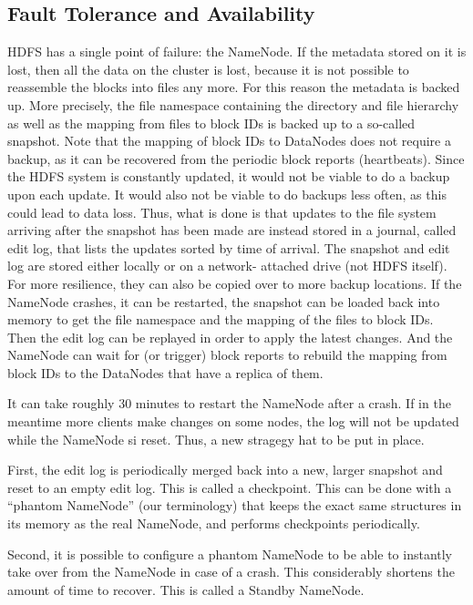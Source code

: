 \subsection{Fault Tolerance and Availability}
HDFS has a single point of failure: the NameNode. If the metadata stored on it is lost, then all the data on the cluster is lost, because it is not possible to reassemble the blocks into files any more. For this reason the metadata is backed up. More precisely, the file namespace containing the directory and file hierarchy as well as the mapping from files to block IDs is backed up to a so-called snapshot. Note that the mapping of block IDs to DataNodes does not require a backup, as it can be recovered from the periodic block reports (heartbeats). Since the HDFS system is constantly updated, it would not be viable to do a backup upon each update. It would also not be viable to do backups less often, as this could lead to data loss. Thus, what is done is that updates to the file system arriving after the snapshot has been made are instead stored in a journal, called edit log, that lists the updates sorted by time of arrival. The snapshot and edit log are stored either locally or on a network- attached drive (not HDFS itself). For more resilience, they can also be copied over to more backup locations. If the NameNode crashes, it can be restarted, the snapshot can be loaded back into memory to get the file namespace and the mapping of the files to block IDs. Then the edit log can be replayed in order to apply the latest changes. And the NameNode can wait for (or trigger) block reports to rebuild the mapping from block IDs to the DataNodes that have a replica of them.

It can take roughly 30 minutes to restart the NameNode after a crash. If in the meantime more clients make changes on some nodes, the log will not be updated while the NameNode si reset. Thus, a new stragegy hat to be put in place.

First, the edit log is periodically merged back into a new, larger snapshot and reset to an empty edit log. This is called a checkpoint. This can be done with a “phantom NameNode” (our terminology) that keeps the exact same structures in its memory as the real NameNode, and performs checkpoints periodically.

Second, it is possible to configure a phantom NameNode to be able to instantly take over from the NameNode in case of a crash. This considerably shortens the amount of time to recover. This is called a Standby NameNode.

